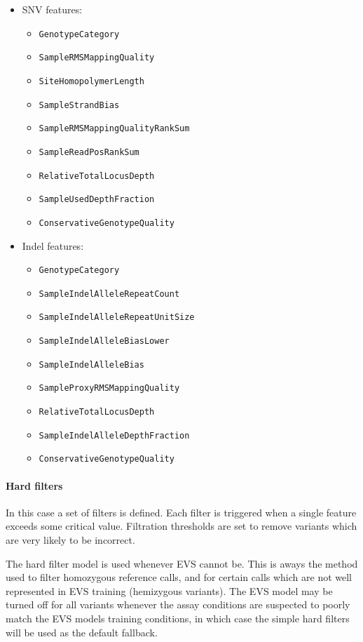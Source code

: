 \documentclass{article}
\begin{document}
\begin{itemize}
    \item SNV features:
    \begin{itemize}
        \item \texttt{GenotypeCategory}
        \item \texttt{SampleRMSMappingQuality}
        \item \texttt{SiteHomopolymerLength}
        \item \texttt{SampleStrandBias}
        \item \texttt{SampleRMSMappingQualityRankSum}
        \item \texttt{SampleReadPosRankSum}
        \item \texttt{RelativeTotalLocusDepth}
        \item \texttt{SampleUsedDepthFraction}
        \item \texttt{ConservativeGenotypeQuality}
    \end{itemize}
    \item Indel features:
    \begin{itemize}
        \item \texttt{GenotypeCategory}
        \item \texttt{SampleIndelAlleleRepeatCount}
        \item \texttt{SampleIndelAlleleRepeatUnitSize}
        \item \texttt{SampleIndelAlleleBiasLower}
        \item \texttt{SampleIndelAlleleBias}
        \item \texttt{SampleProxyRMSMappingQuality}
        \item \texttt{RelativeTotalLocusDepth}
        \item \texttt{SampleIndelAlleleDepthFraction}
        \item \texttt{ConservativeGenotypeQuality}
    \end{itemize}
\end{itemize}

\paragraph{Hard filters}

In this case a set of filters is defined. Each filter is triggered when a single feature exceeds some critical value. Filtration thresholds are set to remove variants which are very likely to be incorrect.

The hard filter model is used whenever EVS cannot be. This is aways the method used to filter homozygous reference calls, and for certain calls which are not well represented in EVS training (hemizygous variants). The EVS model may be turned off for all variants whenever the assay conditions are suspected to poorly match the EVS models training conditions, in which case the simple hard filters will be used as the default fallback.
\end{document}
